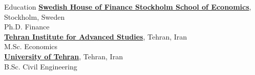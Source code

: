 \documentclass{resume}
\begin{document}
  \begin{rSection}{Education}
    {\bf \href{https://www.hhs.se/en/houseoffinance/}{Swedish House of Finance Stockholm School of Economics}}, Stockholm, Sweden \\\vspace{6pt} 
    { Ph.D. Finance  } \\
    {\bf \href{https://teias.institute/}{Tehran Institute for Advanced Studies}}, Tehran, Iran \\ \vspace{6pt} 
    { M.Sc. Economics  } \\
    {}
    {\bf \href{https://www.ut.ac.ir/en}{University of Tehran}}, Tehran, Iran \\ \vspace{6pt} 
    { B.Sc. Civil Engineering  } 
  \end{rSection}
\end{document}
